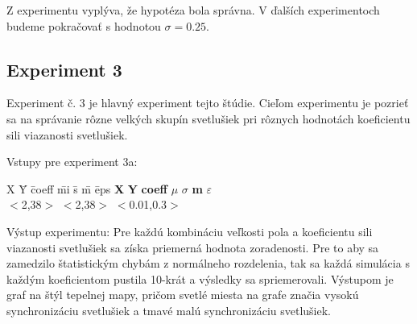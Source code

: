 \documentclass[a4paper, 11pt]{article}
\begin{document}
Z experimentu vyplýva, že hypotéza bola správna. V ďalších experimentoch budeme pokračovať s hodnotou $\sigma = 0.25$.






\subsection{Experiment 3}
Experiment č. 3 je hlavný experiment tejto štúdie. Cieľom experimentu je pozrieť sa na správanie rôzne velkých skupín svetlušiek pri rôznych hodnotách koeficientu sili viazanosti svetlušiek. 


\noindent Vstupy pre experiment 3a:
\begin{tabbing}
    X \quad \quad \quad \quad\= Y \quad \quad \quad \quad\= coeff \quad  \quad \quad \quad\= mi \quad  \= s \quad  \quad \= m \quad \= eps \kill %
    \textbf{X} \> \textbf{Y} \> \textbf{coeff} \> \textbf{$\mu$} \> \textbf{$\sigma$} \> \textbf{m} \> \textbf{$\varepsilon$}\\ 
    $<$2,38$>$          \> $<$2,38$>$    \> $<$0.01,0.3$>$                     
\end{tabbing}

Výstup experimentu:
Pre každú kombináciu veľkosti pola a koeficientu sili viazanosti svetlušiek sa získa priemerná hodnota zoradenosti. Pre to aby sa zamedzilo štatistickým chybám z normálneho rozdelenia, tak sa každá simulácia s každým koeficientom pustila 10-krát a výsledky sa spriemerovali. Výstupom je graf na štýl tepelnej mapy, pričom svetlé miesta na grafe značia vysokú synchronizáciu svetlušiek a tmavé malú synchronizáciu svetlušiek.

\end{document}
